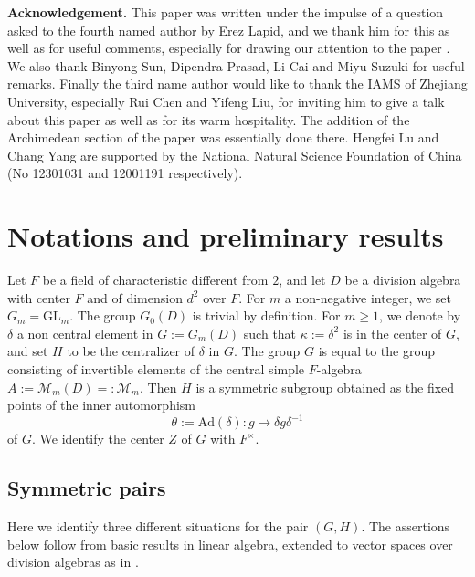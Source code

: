 \documentclass[11pt,letterpaper]{amsart}
\newcommand{\CM}{{\mathcal {M}}} \newcommand{\CN}{{\mathcal {N}}}\newcommand{\CO}{{\mathcal {O}}}\newcommand{\CP}{{\mathcal {P}}}
\newcommand{\GL}{{\mathrm {GL}}} \newcommand{\PGL}{{\mathrm {PGL}}}
\newcommand{\Ad}{\mathrm{Ad}}
\def\d{\delta}
\def\k{\kappa}
\theoremstyle{plain}
\numberwithin{equation}{section}
\begin{document}
\textbf{Acknowledgement.} This paper was written under the impulse of a question asked to the fourth named author by Erez Lapid, and we thank him for this as well as for useful comments, especially for drawing our attention to the paper \cite{LM}. We also thank Binyong Sun, Dipendra Prasad, Li Cai and Miyu Suzuki for useful remarks. Finally the third name author would like to thank the IAMS of Zhejiang University, especially Rui Chen and Yifeng Liu, for inviting him to give a talk about this paper as well as for its warm hospitality. The addition of the Archimedean section of the paper was essentially done there. Hengfei Lu and Chang Yang are supported by the National Natural Science Foundation of China (No 12301031 and 12001191 respectively). 
	
\section{Notations and preliminary results}
	
Let $F$ be a field of characteristic different from $2$, and let $D$ be a division algebra with center $F$ and of dimension $d^2$ over $F$. For $m$ a non-negative integer, we set 
$G_m=\GL_m$. The group $G_0(D)$ is trivial by definition. For $m\geq 1$, we denote by $\delta$ a non central element in $G:=G_m(D)$ such that $\k:=\d^2$ is in the center of $G$, and set $H$ to be the centralizer of $\delta$ in $G$. The group $G$ is equal to the group consisting of invertible elements of the central simple $F$-algebra $A:=\CM_m(D)=:\CM_m$. Then $H$ is a symmetric subgroup obtained as the fixed points of the inner automorphism 
\[\theta:=\Ad(\delta):g\mapsto \delta g \delta^{-1}\] of $G$. We identify the center $Z$ of $G$ with $F^\times$. 

\subsection{Symmetric pairs}

Here we identify three different situations for the pair $(G,H)$. The assertions below follow from basic results in linear algebra, extended to vector spaces over division algebras as in \cite{Lip}. 
\end{document}
